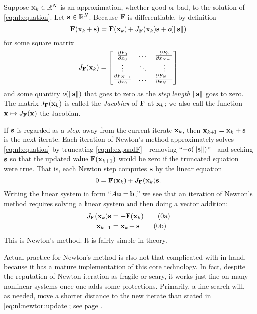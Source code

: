 Suppose $\mathbf{x}_k\in\mathbb{R}^N$ is an approximation, whether good or bad, to the solution of \eqref{eq:nl:equation}.  Let $\mathbf{s}\in\mathbb{R}^N$.  Because $\mathbf{F}$ is differentiable, by definition
\begin{equation}
    \mathbf{F}(\mathbf{x}_{k}+\mathbf{s}) = \mathbf{F}(\mathbf{x}_k) + J_{\mathbf{F}}(\mathbf{x}_k) \mathbf{s} + o(\|\mathbf{s}\|)  \label{eq:nl:expandF}
\end{equation}
for some square matrix
\begin{equation}
J_{\mathbf{F}}(\mathbf{x}_k) = \begin{bmatrix}
    \frac{\partial F_0}{\partial x_0} & \dots & \frac{\partial F_0}{\partial x_{N-1}} \\
    \vdots & \ddots & \vdots \\
    \frac{\partial F_{N-1}}{\partial x_0} & \dots & \frac{\partial F_{N-1}}{\partial x_{N-1}}  \end{bmatrix}  \label{eq:nl:jacdefn}
\end{equation}
and some quantity $o(\|\mathbf{s}\|)$ that goes to zero as the \emph{step length} $\|\mathbf{s}\|$ goes to zero.  The matrix $J_{\mathbf{F}}(\mathbf{x}_k)$ is called the \emph{Jacobian} of $\mathbf{F}$ at $\mathbf{x}_k$; we also call the function $\mathbf{x} \mapsto J_{\mathbf{F}}(\mathbf{x})$ the Jacobian.

If $\mathbf{s}$ is regarded as a \emph{step}, away from the current iterate $\mathbf{x}_k$, then $\mathbf{x}_{k+1} = \mathbf{x}_k + \mathbf{s}$ is the next iterate.  Each iteration of Newton's method approximately solves \eqref{eq:nl:equation} by truncating \eqref{eq:nl:expandF}---removing ``$+o(\|\mathbf{s}\|)$''---and seeking $\mathbf{s}$ so that the updated value $\mathbf{F}(\mathbf{x}_{k+1})$ would be zero if the truncated equation were true.  That is, each Newton step computes $\mathbf{s}$ by the linear equation
\begin{equation}
    0 = \mathbf{F}(\mathbf{x}_k) + J_{\mathbf{F}}(\mathbf{x}_k) \mathbf{s}.
\end{equation}
Writing the linear system in form ``$A\mathbf{u}=\mathbf{b}$,'' we see that an iteration of Newton's method requires solving a linear system and then doing a vector addition:
\label{eq:nl:newton}  %
\begin{align}
    J_{\mathbf{F}}(\mathbf{x}_k) \mathbf{s} &= - \mathbf{F}(\mathbf{x}_k)  \label{eq:nl:newton:eq} \tag{\theequation a} \\
    \mathbf{x}_{k+1} &= \mathbf{x}_k + \mathbf{s}  \label{eq:nl:newton:update} \tag{\theequation b}
\end{align}
This is Newton's method.  It is fairly simple in theory.

Actual practice for Newton's method is also not that complicated with \PETSc in hand, because it has a mature implementation of this core technology.  In fact, despite the reputation of Newton iteration as fragile or scary, it works just fine on many nonlinear systems once one adds some protections.  Primarily, a line search will, as needed, move a shorter distance to the new iterate than stated in \eqref{eq:nl:newton:update}; see page \pageref{sec:linesearch}.

